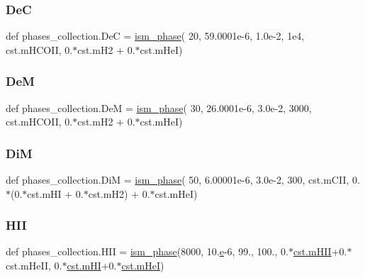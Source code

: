 \subsubsection{\texorpdfstring{DeC}{DeC}}
{\footnotesize\ttfamily def phases\+\_\+collection.\+DeC = \hyperlink{namespacephases__collection_aae55a1d8374bfc3868cd04555c049676}{ism\+\_\+phase}( 20, 59.\+0001e-\/6, 1.\+0e-\/2, 1e4, cst.\+m\+H\+C\+O\+I\+I, 0.$\ast$cst.\+m\+H2 + 0.$\ast$cst.\+m\+He\+I)}

\mbox{\label{namespacephases__collection_ade2507f5191c147595031d0c1dffaf8d}} 
\subsubsection{\texorpdfstring{DeM}{DeM}}
{\footnotesize\ttfamily def phases\+\_\+collection.\+DeM = \hyperlink{namespacephases__collection_aae55a1d8374bfc3868cd04555c049676}{ism\+\_\+phase}( 30, 26.\+0001e-\/6, 3.\+0e-\/2, 3000, cst.\+m\+H\+C\+O\+I\+I, 0.$\ast$cst.\+m\+H2 + 0.$\ast$cst.\+m\+He\+I)}

\mbox{\label{namespacephases__collection_aea510fe67ff57ffd322b7af98ae593f2}} 
\subsubsection{\texorpdfstring{DiM}{DiM}}
{\footnotesize\ttfamily def phases\+\_\+collection.\+DiM = \hyperlink{namespacephases__collection_aae55a1d8374bfc3868cd04555c049676}{ism\+\_\+phase}( 50, 6.\+00001e-\/6, 3.\+0e-\/2, 300, cst.\+m\+C\+I\+I, 0.$\ast$(0.$\ast$cst.\+m\+H\+I + 0.$\ast$cst.\+m\+H2) + 0.$\ast$cst.\+m\+He\+I)}

\mbox{\label{namespacephases__collection_a7bb67ada21406d94c4e307f60dea0d69}} 
\subsubsection{\texorpdfstring{H\+II}{HII}}
{\footnotesize\ttfamily def phases\+\_\+collection.\+H\+II = \hyperlink{namespacephases__collection_aae55a1d8374bfc3868cd04555c049676}{ism\+\_\+phase}(8000, 10.\hyperlink{constants_8h_a2b076531cd50c7b55702a53221f2ac72}{e}-\/6, 99., 100., 0.$\ast$\hyperlink{constants_8h_a469899272f9f1b48961397bbd6cc84eb}{cst.\+m\+H\+II}+0.$\ast$cst.\+m\+He\+II, 0.$\ast$\hyperlink{constants_8h_a269606ec235d66ed4e8fc93442842cef}{cst.\+m\+HI}+0.$\ast$\hyperlink{constants_8h_a4158a5aec7d8c74f97fdbf32566a7fb6}{cst.\+m\+HeI})}

